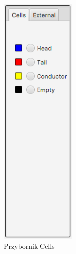 \documentclass{report}
\begin{document}
\begin{figure}[H]
    \centering
    \begin{subfigure}[b]{0.49\textwidth}
        \centering
        \includegraphics[width=0.4\textwidth]{przybornik1}
        \caption{Przybornik Cells}
    \end{subfigure}
    \begin{subfigure}[b]{0.49\textwidth}
        \centering

\end{subfigure}
\end{figure}
\end{document}
